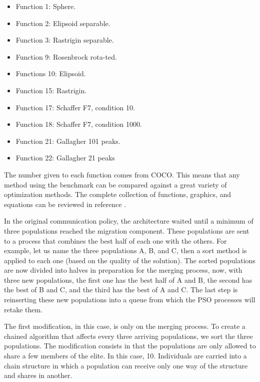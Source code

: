 \documentclass[runningheads]{llncs}
\begin{document}
\begin{multicols}{2}
\begin{itemize}

    \item Function 1: Sphere.
    \item Function 2: Elipsoid separable.
    \item Function 3: Rastrigin separable.
    \item Function 9: Rosenbrock rota-ted.
    \item Functions 10: Elipsoid.
    \item Function 15: Rastrigin.
    \item Function 17: Schaffer F7, condition 10.
    \item Function 18: Schaffer F7, condition 1000.
    \item Function 21: Gallagher 101 peaks.
    \item Function 22: Gallagher 21 peaks

\end{itemize}
\end{multicols}

The number given to each function comes from COCO. This means that any method
using the benchmark can be compared against a great variety of optimization
methods. The complete collection of functions, graphics, and equations can be
reviewed in reference \cite{bbob}.


In the original communication policy, the architecture waited until a minimum of
three populations reached the migration component. These populations are sent to
a process that combines the best half of each one with the others. For example,
let us name the three populations A, B, and C, then a sort method is applied to
each one (based on the quality of the solution). The sorted populations are now
divided into halves in preparation for the merging process, now, with three new
populations, the first one has the best half of A and B, the second has the best
of B and C, and the third has the best of A and C. The last step is reinserting
these new populations into a queue from which the PSO processes will retake
them.

The first modification, in this case, is only on the merging process. To create
a chained algorithm that affects every three arriving populations, we sort the
three populations. The modification consists in that the populations are only
allowed to share a few members of the elite. In this case, 10. Individuals are
carried into a chain structure in which a population can receive only one way of
the structure and shares in another.
\end{document}
